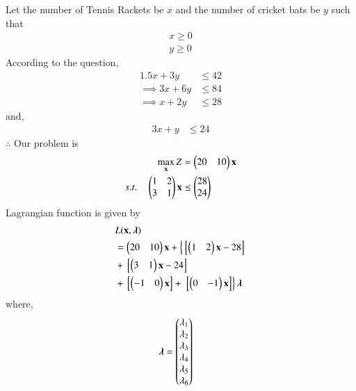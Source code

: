 
\begin{table}[!ht]
\centering
{}
\caption{factory Requirements}
\label{opt/14/tab:table1}
\end{table}
Let the number of Tennis Rackets  be $x$ and the number of cricket bats be $y$  such that 
\begin{align}
x \geq 0 \\
y \geq 0 
\end{align}
According to the question,
\begin{align}
1.5x+3y &\leq 42 \\
\implies 3x+6y &\leq 84 \\
\implies x+2y &\leq 28 
\end{align}
and,
\begin{align}
3x+y &\leq 24 
\end{align}
$\therefore$ Our problem is
\begin{align}
\max_{\mathbf{x}} Z &= \begin{pmatrix}20 & 10\end{pmatrix}\mathbf{x}\\
s.t. \quad \begin{pmatrix}1 & 2 \\ 3 & 1\end{pmatrix}\mathbf{x} &\preceq \begin{pmatrix}28\\24\end{pmatrix} 
\end{align}
Lagrangian function is given by
\begin{equation}
\begin{aligned}
&L(\mathbf{x},\boldsymbol{\lambda}) \\ &= \begin{pmatrix}20 & 10\end{pmatrix}\mathbf{x}+\left\{{}\left[\begin{pmatrix}1 & 2\end{pmatrix}\mathbf{x}-28\right]\right. \\ &+ {}\left[\begin{pmatrix}3 & 1\end{pmatrix}\mathbf{x}-24\right]\\ &+ {}\left[\begin{pmatrix}-1 & 0\end{pmatrix}\mathbf{x}\right] +\left.{}\left[\begin{pmatrix}0 & -1\end{pmatrix}\mathbf{x}\right]\right\}\boldsymbol{\lambda}
\end{aligned}
\end{equation}
where,
\begin{align}
\boldsymbol{\lambda} &= \begin{pmatrix}\lambda_1 \\ \lambda_2 \\ \lambda_3 \\ \lambda_4 \\ \lambda_5 \\ \lambda_6\end{pmatrix}
\end{align}
